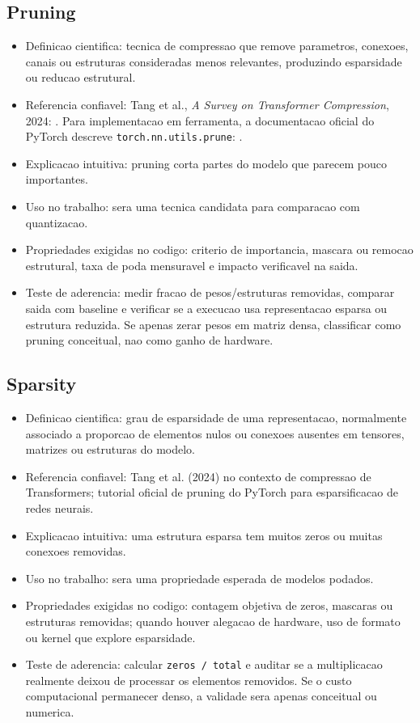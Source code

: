 \subsection{Pruning}


\begin{itemize}
\item Definicao cientifica: tecnica de compressao que remove parametros, conexoes,
canais ou estruturas consideradas menos relevantes, produzindo esparsidade ou
reducao estrutural.
\item Referencia confiavel: Tang et al., \emph{A Survey on Transformer Compression},
2024: . Para implementacao em ferramenta, a
documentacao oficial do PyTorch descreve \texttt{torch.\allowbreak{}nn.\allowbreak{}utils.\allowbreak{}prune}:
.
\item Explicacao intuitiva: pruning corta partes do modelo que parecem pouco
importantes.
\item Uso no trabalho: sera uma tecnica candidata para comparacao com quantizacao.
\item Propriedades exigidas no codigo: criterio de importancia, mascara ou remocao
estrutural, taxa de poda mensuravel e impacto verificavel na saida.
\item Teste de aderencia: medir fracao de pesos/estruturas removidas, comparar
saida com baseline e verificar se a execucao usa representacao esparsa ou
estrutura reduzida. Se apenas zerar pesos em matriz densa, classificar como
pruning conceitual, nao como ganho de hardware.
\end{itemize}


\subsection{Sparsity}


\begin{itemize}
\item Definicao cientifica: grau de esparsidade de uma representacao, normalmente
associado a proporcao de elementos nulos ou conexoes ausentes em tensores,
matrizes ou estruturas do modelo.
\item Referencia confiavel: Tang et al. (2024) no contexto de compressao de
Transformers; tutorial oficial de pruning do PyTorch para esparsificacao de
redes neurais.
\item Explicacao intuitiva: uma estrutura esparsa tem muitos zeros ou muitas
conexoes removidas.
\item Uso no trabalho: sera uma propriedade esperada de modelos podados.
\item Propriedades exigidas no codigo: contagem objetiva de zeros, mascaras ou
estruturas removidas; quando houver alegacao de hardware, uso de formato ou
kernel que explore esparsidade.
\item Teste de aderencia: calcular \texttt{zeros /\allowbreak{} total} e auditar se a multiplicacao
realmente deixou de processar os elementos removidos. Se o custo computacional
permanecer denso, a validade sera apenas conceitual ou numerica.
\end{itemize}


